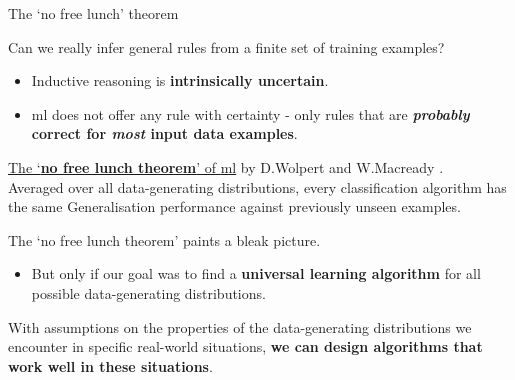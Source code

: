 
\begin{frame}[t]{The `no free lunch' theorem}

Can we really infer general rules from a finite set of training examples?
\begin{itemize}
  \item Inductive reasoning is {\bf intrinsically uncertain}.
  \item \gls{ml} does not offer any rule with certainty - 
  only rules that are {\bf {\em probably} correct for {\em most} input data examples}.
\end{itemize}

\vspace{0.1cm}

\begin{blockexample}{}
\underline{The `{\bf no free lunch theorem}' of  \gls{ml}} 
by D.Wolpert and W.Macready \cite{NoFreeLunch}.\\
{\small
Averaged over all data-generating distributions,
every classification algorithm has the same Generalisation performance
against previously unseen examples.\\
}
\end{blockexample}

\vspace{0.1cm}

The `no free lunch theorem' paints a bleak picture.
\begin{itemize}
    \item
    But only if our goal was to find a {\bf universal learning algorithm}
   for all possible data-generating distributions.
\end{itemize}

\vspace{0.2cm}

With assumptions on the properties of the data-generating distributions we encounter
in specific real-world situations, {\bf we can design algorithms that work well 
in these situations}.

\end{frame}
